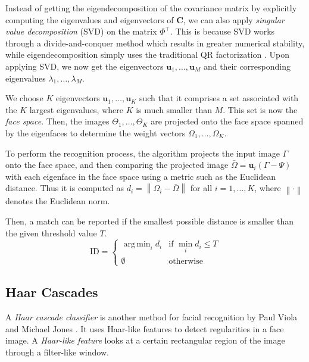 Instead of getting the eigendecomposition of the covariance matrix by explicitly computing the eigenvalues and eigenvectors of $\mathbf{C}$, we can also apply \textit{singular value decomposition} (SVD) on the matrix $\Phi^\top$. This is because SVD works through a divide-and-conquer method which results in greater numerical stability, while eigendecomposition simply uses the traditional QR factorization \cite{nakatsukasa_stable_2013, gu_divide-and-conquer_1995}. Upon applying SVD, we now get the eigenvectors $\mathbf{u}_1, \ldots, \mathbf{u}_M$ and their corresponding eigenvalues $\lambda_1, \ldots, \lambda_M$.

We choose $K$ eigenvectors $\mathbf{u}_1, \ldots, \mathbf{u}_K$ such that it comprises a set associated with the $K$ largest eigenvalues, where $K$ is much smaller than $M$. This set is now the \textit{face space}. Then, the images $\Theta_1, \ldots, \Theta_K$ are projected onto the face space spanned by the eigenfaces to determine the weight vectors $\Omega_1, \ldots, \Omega_K$.

To perform the recognition process, the algorithm projects the input image $\Gamma$ onto the face space, and then comparing the projected image $\bar{\Omega} = \mathbf{u}_i\left(\Gamma - \Psi\right)$ with each eigenface in the face space using a metric such as the Euclidean distance. Thus it is computed as $d_i = \left\lVert \Omega_i -\bar{\Omega} \right\rVert$ for all $i=1,\ldots,K$, where $\left\lVert \cdot \right\rVert$ denotes the Euclidean norm.

Then, a match can be reported if the smallest possible distance is smaller than the given threshold value $T$. 
\newcommand{\argmin}{\mathop{\mathrm{arg\,min}}}  
\[\text{ID} = \begin{cases}\argmin_i d_i & \text{if } \min_i d_i \le T \\\emptyset & \text {otherwise}\end{cases}
\]

\subsection{Haar Cascades}
A \textit{Haar cascade classifier} is another method for facial recognition by Paul Viola and Michael Jones \cite{viola_robust_2004}. It uses Haar-like features to detect regularities in a face image. A \textit{Haar-like feature} looks at a certain rectangular region of the image through a filter-like window.

